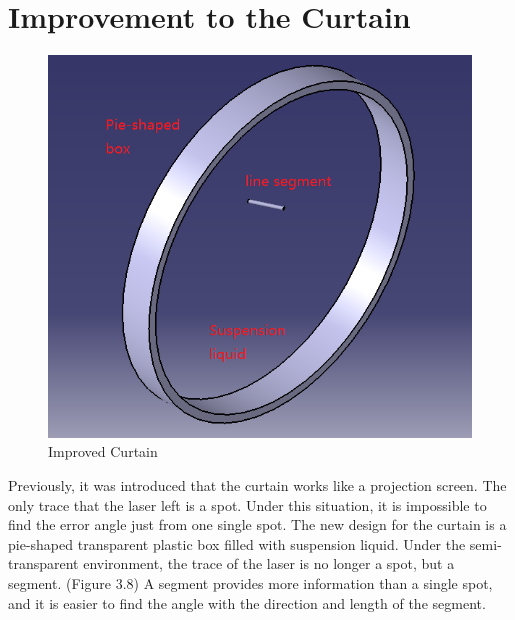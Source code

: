 \documentclass[letterpaper,12pt,oneside]{book}
\begin{document}
		\section{Improvement to the Curtain}
		\begin{figure}[ht!]
			\begin{center}
				\includegraphics[scale = 0.8]{improvedcurtain.png}
				\caption{Improved Curtain}
			\end{center}
		\end{figure}
		Previously, it was introduced that the curtain works like a projection screen. The only trace that the laser left is a spot. Under this situation, it is impossible to find the error angle just from one single spot. The new design for the curtain is a pie-shaped transparent plastic box filled with suspension liquid. Under the semi-transparent environment, the trace of the laser is no longer a spot, but a segment. (Figure 3.8) A segment provides more information than a single spot, and it is easier to find the angle with the direction and length of the segment.
		
\end{document}
